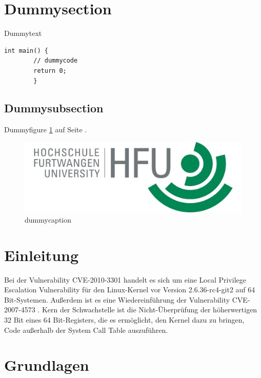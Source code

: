 \documentclass[11pt,a4paper]{article}
\begin{document}
\lstset{language=C}


\clearpage
\setcounter{page}{1}
\tableofcontents

\section{Dummysection}
\setcounter{page}{1}
Dummytext \cite{DIE0}
\begin{lstlisting}[frame=single]
int main() {
        // dummycode
        return 0;
        }
\end{lstlisting}
\subsection{Dummysubsection}
Dummyfigure \ref{hfu} auf Seite \pageref{hfu}.

\begin{figure}[h!]
  \caption{dummycaption}
  \label{hfu}
  \centering
    \includegraphics[scale=1]{hfu.png}
\end{figure}


\section{Einleitung}
Bei der Vulnerability CVE-2010-3301 handelt es sich um eine Local Privilege Escalation Vulnerability für den Linux-Kernel vor Version 2.6.36-rc4-git2 auf 64 Bit-Systemen. Außerdem ist es eine Wiedereinführung der Vulnerability CVE-2007-4573 \cite{CVE0}. Kern der Schwachstelle ist die Nicht-Überprüfung der höherwertigen 32 Bit eines 64 Bit-Registers, die es ermöglicht, den Kernel dazu zu bringen, Code außerhalb der System Call Table auszuführen.
\section{Grundlagen}
\end{document}
